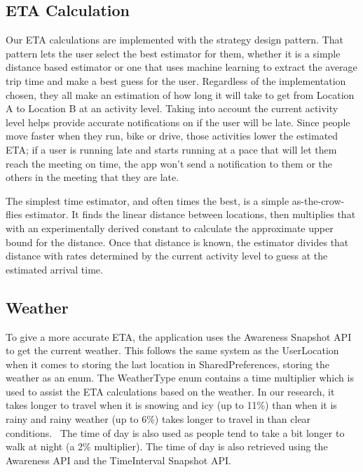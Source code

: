 \subsection{ETA Calculation}
Our ETA calculations are implemented with the strategy design pattern.  That pattern lets the user select the best estimator for them, whether it is a simple distance based estimator or one that uses machine learning to extract the average trip time and make a best guess for the user. Regardless of the implementation chosen, they all make an estimation of how long it will take to get from Location A to Location B at an activity level. Taking into account the current activity level helps provide accurate notifications on if the user will be late. Since people move faster when they run, bike or drive, those activities lower the estimated ETA; if a user is running late and starts running at a pace that will let them reach the meeting on time, the app won't send a notification to them or the others in the meeting that they are late. 

The simplest time estimator, and often times the best, is a simple as-the-crow-flies estimator. It finds the linear distance between locations, then multiplies that with an experimentally derived constant to calculate the approximate upper bound for the distance.  Once that distance is known, the estimator divides that distance with rates determined by the current activity level to guess at the estimated arrival time.

\subsection{Weather}
To give a more accurate ETA, the application uses the Awareness Snapshot API to get the current weather. This follows the same system as the UserLocation when it comes to storing the last location in SharedPreferences, storing the weather as an enum. The WeatherType enum contains a time multiplier which is used to assist the ETA calculations based on the weather. In our research, it takes longer to travel when it is snowing and icy (up to 11\%) than when it is rainy and rainy weather (up to 6\%) takes longer to travel in than clear conditions.~\cite{TSAPAKIS2013204} The time of day is also used as people tend to take a bit longer to walk at night (a 2\% multiplier). The time of day is also retrieved using the Awareness API and the TimeInterval Snapshot API.

